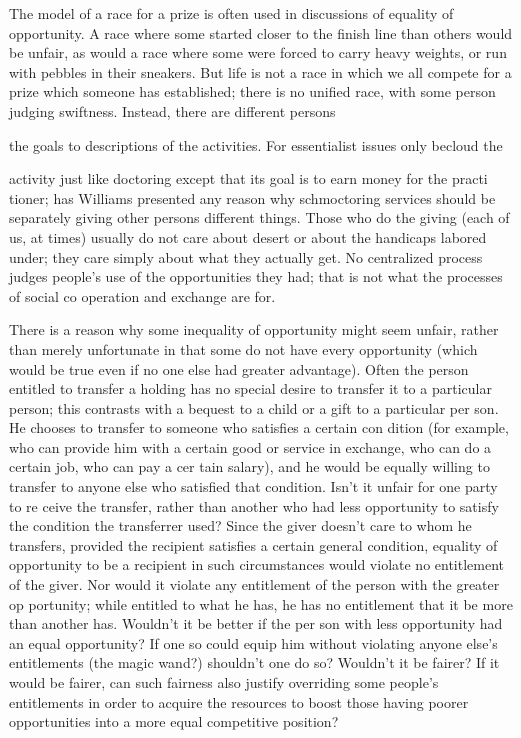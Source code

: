 \documentclass[11pt,openany]{book}
\begin{document}
The model of a race for a prize is often used in discussions of equality of opportunity. A race where some started closer to the finish line than others would be unfair, as would a race where some were forced to carry heavy weights, or run with pebbles in their sneakers. But life is not a race in which we all compete for a prize which someone has established; there is no unified race, with some person judging swiftness. Instead, there are different persons 

the goals to descriptions of the activities. For essentialist issues only becloud the 

activity just like doctoring except that its goal is to earn money for the practi tioner; has Williams presented any reason why schmoctoring services should be separately giving other persons different things. Those who do the giving (each of us, at times) usually do not care about desert or about the handicaps labored under; they care simply about what they actually get. No centralized process judges people's use of the opportunities they had; that is not what the processes of social co operation and exchange are for. 

There is a reason why some inequality of opportunity might seem unfair, rather than merely unfortunate in that some do not have every opportunity (which would be true even if no one else had greater advantage). Often the person entitled to transfer a holding has no special desire to transfer it to a particular person; this contrasts with a bequest to a child or a gift to a particular per son. He chooses to transfer to someone who satisfies a certain con dition (for example, who can provide him with a certain good or service in exchange, who can do a certain job, who can pay a cer tain salary), and he would be equally willing to transfer to anyone else who satisfied that condition. Isn't it unfair for one party to re ceive the transfer, rather than another who had less opportunity to satisfy the condition the transferrer used? Since the giver doesn't care to whom he transfers, provided the recipient satisfies a certain general condition, equality of opportunity to be a recipient in such circumstances would violate no entitlement of the giver. Nor would it violate any entitlement of the person with the greater op portunity; while entitled to what he has, he has no entitlement that it be more than another has. Wouldn't it be better if the per son with less opportunity had an equal opportunity? If one so could equip him without violating anyone else's entitlements (the magic wand?) shouldn't one do so? Wouldn't it be fairer? If it would be fairer, can such fairness also justify overriding some people's entitlements in order to acquire the resources to boost those having poorer opportunities into a more equal competitive position? 
\end{document}
